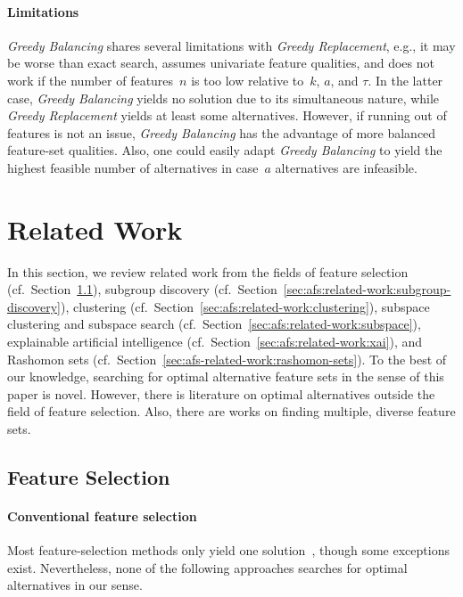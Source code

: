 \documentclass{article}
\theoremstyle{definition}
\begin{document}
\paragraph{Limitations}

\emph{Greedy Balancing} shares several limitations with \emph{Greedy Replacement}, e.g., it may be worse than exact search, assumes univariate feature qualities, and does not work if the number of features~$n$ is too low relative to~$k$, $a$, and $\tau$.
In the latter case, \emph{Greedy Balancing} yields no solution due to its simultaneous nature, while \emph{Greedy Replacement} yields at least some alternatives.
However, if running out of features is not an issue, \emph{Greedy Balancing} has the advantage of more balanced feature-set qualities.
Also, one could easily adapt \emph{Greedy Balancing} to yield the highest feasible number of alternatives in case~$a$ alternatives are infeasible.

\section{Related Work}
\label{sec:afs:related-work}

In this section, we review related work from the fields of feature selection (cf.~Section~\ref{sec:afs:related-work:feature-selection}), subgroup discovery (cf.~Section~\ref{sec:afs:related-work:subgroup-discovery}), clustering (cf.~Section~\ref{sec:afs:related-work:clustering}), subspace clustering and subspace search (cf.~Section~\ref{sec:afs:related-work:subspace}), explainable artificial intelligence (cf.~Section~\ref{sec:afs:related-work:xai}),
and Rashomon sets (cf.~Section~\ref{sec:afs-related-work:rashomon-sets}).
To the best of our knowledge, searching for optimal alternative feature sets in the sense of this paper is novel.
However, there is literature on optimal alternatives outside the field of feature selection.
Also, there are works on finding multiple, diverse feature sets.

\subsection{Feature Selection}
\label{sec:afs:related-work:feature-selection}

\paragraph{Conventional feature selection}

Most feature-selection methods only yield one solution~\cite{borboudakis2021extending}, though some exceptions exist.
Nevertheless, none of the following approaches searches for optimal alternatives in our sense.
\end{document}
